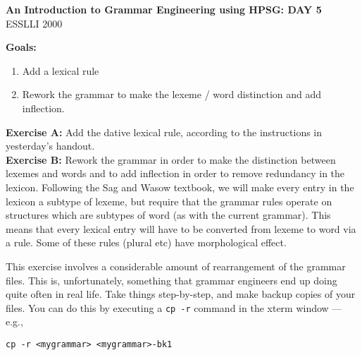 \documentclass[10pt]{article}
\begin{document}
\begin{center}
\textbf{An Introduction to Grammar Engineering using HPSG: DAY 5}\\
ESSLLI 2000
\end{center}

\medskip
\textbf{Goals:}
\begin{enumerate}
\item Add a lexical rule
\item Rework the grammar to make the lexeme / word distinction and
add inflection.
\end{enumerate}

\smallskip
\textbf{Exercise A:}
Add the dative lexical rule, according to the instructions in yesterday's 
handout.\\
\textbf{Exercise B:}
Rework the grammar in order to make the distinction between 
lexemes and words and to
add inflection in order 
to remove redundancy in the lexicon.  Following the Sag and Wasow textbook, we will
make every entry in the lexicon a subtype of lexeme, but require that the
grammar rules operate on structures which are subtypes of word (as with the current grammar).  This means that every lexical entry will have to be converted from
lexeme to word via a rule.  Some of these rules (plural etc) have morphological
effect.

This exercise involves a considerable amount of rearrangement 
of the grammar files.  This is, unfortunately, something
that grammar engineers end up doing quite often in real life.
Take things step-by-step, and make backup copies of your files.
You can do this by executing a {\tt cp -r} command in the xterm
window --- e.g.,
\begin{verbatim}
cp -r <mygrammar> <mygrammar>-bk1
\end{verbatim}
\end{document}
